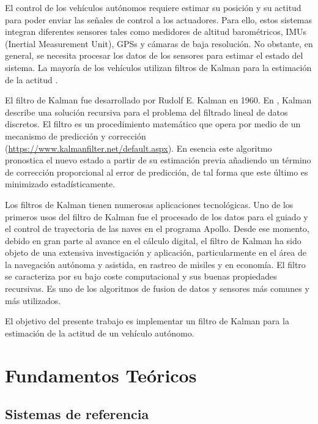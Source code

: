 \documentclass[a4paper,12pt]{book}
\begin{document}
El control de los vehículos autónomos requiere estimar su posición y su actitud para poder enviar las señales de control a los actuadores. Para ello, estos sistemas integran diferentes sensores tales como medidores de altitud barométricos, IMUs (Inertial Measurement Unit), GPSs y cámaras de baja resolución. No obstante, en general, se necesita procesar los datos de los sensores para  estimar el estado del sistema. La mayoría de los vehículos utilizan filtros de Kalman para la estimación de la actitud \cite{zhang2005navigation, pettersson2015extended, trawny2005indirect}.


El filtro de Kalman fue desarrollado por Rudolf E. Kalman en 1960. En \cite{kalman1960new}, Kalman describe una solución recursiva para el problema del filtrado lineal de datos discretos. El filtro es un procedimiento matemático que opera por medio de un mecanismo de predicción y corrección (\url{https://www.kalmanfilter.net/default.aspx}). En esencia este algoritmo pronostica el nuevo estado a partir de su estimación previa
añadiendo un término de corrección proporcional al error de predicción, de tal forma que este último es minimizado estadísticamente.


Los filtros de Kalman tienen numerosas aplicaciones tecnológicas. Uno de los primeros usos del filtro de Kalman fue el procesado de los datos para  el guiado y el control de trayectoria de las naves en el programa Apollo. Desde ese momento, debido en gran parte al avance en el cálculo digital, el filtro de Kalman ha sido objeto de una extensiva investigación y aplicación, particularmente en el área de la navegación autónoma y asistida, en rastreo de misiles y en economía. El filtro se caracteriza por su bajo coste computacional y sus buenas propiedades recursivas. Es uno de los algoritmos de fusion de datos y sensores más comunes y más utilizados. 


El objetivo del presente trabajo es implementar un filtro de Kalman para la estimación de la actitud de un vehículo autónomo.


\chapter{Fundamentos Teóricos}\label{chapter:fundamentos}


\section{Sistemas de referencia}
\end{document}
